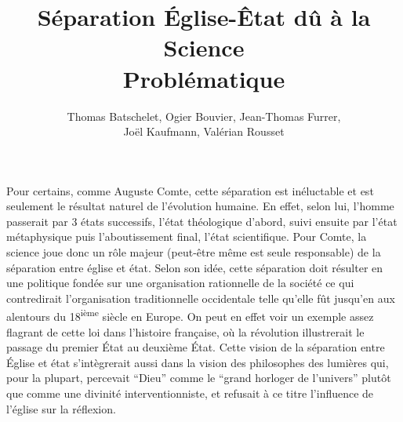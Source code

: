 \documentclass{article}
\title{Séparation Église-Êtat dû à la Science \\
  \large{Problématique}}
\author{Thomas Batschelet, Ogier Bouvier, Jean-Thomas Furrer, \\ Joël Kaufmann, Valérian Rousset}
\begin{document}
\maketitle

Pour certains, comme Auguste Comte, cette séparation est inéluctable
et est seulement le résultat naturel de l'évolution humaine. En effet,
selon lui, l'homme passerait par 3 états successifs, l'état
théologique d'abord, suivi ensuite par l'état métaphysique puis
l'aboutissement final, l'état scientifique. Pour Comte, la science
joue donc un rôle majeur (peut-être même est seule responsable) de la
séparation entre église et état. Selon son idée, cette séparation doit
résulter en une politique fondée sur une organisation rationnelle de
la société ce qui contredirait l'organisation traditionnelle
occidentale telle qu'elle fût jusqu'en aux alentours du
18\textsuperscript{ième} siècle en Europe. On peut en effet voir un
exemple assez flagrant de cette loi dans l'histoire française, où la
révolution illustrerait le passage du premier État au deuxième
État. Cette vision de la séparation entre Église et état s'intègrerait
aussi dans la vision des philosophes des lumières qui, pour la
plupart, percevait ``Dieu'' comme le ``grand horloger de l'univers''
plutôt que comme une divinité interventionniste, et refusait à ce titre
l'influence de l'église sur la réflexion.
\end{document}
